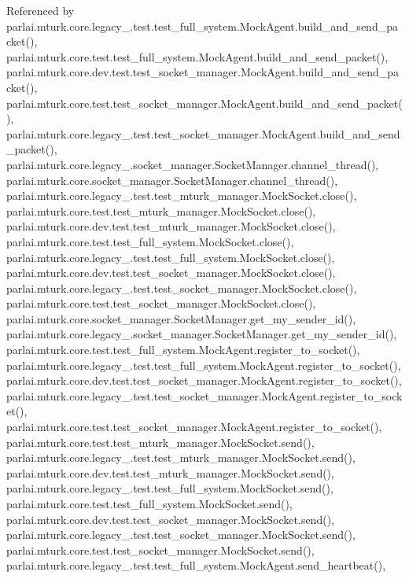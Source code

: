 Referenced by parlai.\+mturk.\+core.\+legacy\+\_.\+test.\+test\+\_\+full\+\_\+system.\+Mock\+Agent.\+build\+\_\+and\+\_\+send\+\_\+packet(), parlai.\+mturk.\+core.\+test.\+test\+\_\+full\+\_\+system.\+Mock\+Agent.\+build\+\_\+and\+\_\+send\+\_\+packet(), parlai.\+mturk.\+core.\+dev.\+test.\+test\+\_\+socket\+\_\+manager.\+Mock\+Agent.\+build\+\_\+and\+\_\+send\+\_\+packet(), parlai.\+mturk.\+core.\+test.\+test\+\_\+socket\+\_\+manager.\+Mock\+Agent.\+build\+\_\+and\+\_\+send\+\_\+packet(), parlai.\+mturk.\+core.\+legacy\+\_.\+test.\+test\+\_\+socket\+\_\+manager.\+Mock\+Agent.\+build\+\_\+and\+\_\+send\+\_\+packet(), parlai.\+mturk.\+core.\+legacy\+\_.\+socket\+\_\+manager.\+Socket\+Manager.\+channel\+\_\+thread(), parlai.\+mturk.\+core.\+socket\+\_\+manager.\+Socket\+Manager.\+channel\+\_\+thread(), parlai.\+mturk.\+core.\+legacy\+\_.\+test.\+test\+\_\+mturk\+\_\+manager.\+Mock\+Socket.\+close(), parlai.\+mturk.\+core.\+test.\+test\+\_\+mturk\+\_\+manager.\+Mock\+Socket.\+close(), parlai.\+mturk.\+core.\+dev.\+test.\+test\+\_\+mturk\+\_\+manager.\+Mock\+Socket.\+close(), parlai.\+mturk.\+core.\+test.\+test\+\_\+full\+\_\+system.\+Mock\+Socket.\+close(), parlai.\+mturk.\+core.\+legacy\+\_.\+test.\+test\+\_\+full\+\_\+system.\+Mock\+Socket.\+close(), parlai.\+mturk.\+core.\+dev.\+test.\+test\+\_\+socket\+\_\+manager.\+Mock\+Socket.\+close(), parlai.\+mturk.\+core.\+legacy\+\_.\+test.\+test\+\_\+socket\+\_\+manager.\+Mock\+Socket.\+close(), parlai.\+mturk.\+core.\+test.\+test\+\_\+socket\+\_\+manager.\+Mock\+Socket.\+close(), parlai.\+mturk.\+core.\+socket\+\_\+manager.\+Socket\+Manager.\+get\+\_\+my\+\_\+sender\+\_\+id(), parlai.\+mturk.\+core.\+legacy\+\_.\+socket\+\_\+manager.\+Socket\+Manager.\+get\+\_\+my\+\_\+sender\+\_\+id(), parlai.\+mturk.\+core.\+test.\+test\+\_\+full\+\_\+system.\+Mock\+Agent.\+register\+\_\+to\+\_\+socket(), parlai.\+mturk.\+core.\+legacy\+\_.\+test.\+test\+\_\+full\+\_\+system.\+Mock\+Agent.\+register\+\_\+to\+\_\+socket(), parlai.\+mturk.\+core.\+dev.\+test.\+test\+\_\+socket\+\_\+manager.\+Mock\+Agent.\+register\+\_\+to\+\_\+socket(), parlai.\+mturk.\+core.\+legacy\+\_.\+test.\+test\+\_\+socket\+\_\+manager.\+Mock\+Agent.\+register\+\_\+to\+\_\+socket(), parlai.\+mturk.\+core.\+test.\+test\+\_\+socket\+\_\+manager.\+Mock\+Agent.\+register\+\_\+to\+\_\+socket(), parlai.\+mturk.\+core.\+test.\+test\+\_\+mturk\+\_\+manager.\+Mock\+Socket.\+send(), parlai.\+mturk.\+core.\+legacy\+\_.\+test.\+test\+\_\+mturk\+\_\+manager.\+Mock\+Socket.\+send(), parlai.\+mturk.\+core.\+dev.\+test.\+test\+\_\+mturk\+\_\+manager.\+Mock\+Socket.\+send(), parlai.\+mturk.\+core.\+legacy\+\_.\+test.\+test\+\_\+full\+\_\+system.\+Mock\+Socket.\+send(), parlai.\+mturk.\+core.\+test.\+test\+\_\+full\+\_\+system.\+Mock\+Socket.\+send(), parlai.\+mturk.\+core.\+dev.\+test.\+test\+\_\+socket\+\_\+manager.\+Mock\+Socket.\+send(), parlai.\+mturk.\+core.\+legacy\+\_.\+test.\+test\+\_\+socket\+\_\+manager.\+Mock\+Socket.\+send(), parlai.\+mturk.\+core.\+test.\+test\+\_\+socket\+\_\+manager.\+Mock\+Socket.\+send(), parlai.\+mturk.\+core.\+legacy\+\_.\+test.\+test\+\_\+full\+\_\+system.\+Mock\+Agent.\+send\+\_\+heartbeat(), 
